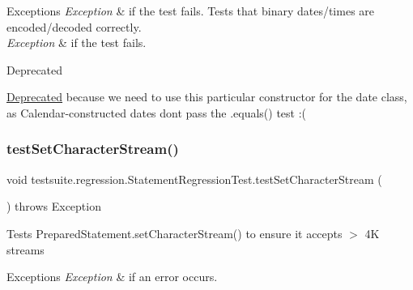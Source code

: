 \begin{DoxyExceptions}{Exceptions}
{\em Exception} & if the test fails. Tests that binary dates/times are encoded/decoded correctly.\\
\hline
{\em Exception} & if the test fails.\\
\hline
\end{DoxyExceptions}
\begin{DoxyRefDesc}{Deprecated}
\item[\mbox{\hyperlink{deprecated__deprecated000026}{Deprecated}}]because we need to use this particular constructor for the date class, as Calendar-\/constructed dates don\textquotesingle{}t pass the .equals() test \+:( \end{DoxyRefDesc}
\mbox{\label{classtestsuite_1_1regression_1_1_statement_regression_test_a8043401e658d50f132bd6407926ed1f6}} 
\subsubsection{\texorpdfstring{test\+Set\+Character\+Stream()}{testSetCharacterStream()}}
{\footnotesize\ttfamily void testsuite.\+regression.\+Statement\+Regression\+Test.\+test\+Set\+Character\+Stream (\begin{DoxyParamCaption}{ }\end{DoxyParamCaption}) throws Exception}

Tests Prepared\+Statement.\+set\+Character\+Stream() to ensure it accepts $>$ 4K streams


\begin{DoxyExceptions}{Exceptions}
{\em Exception} & if an error occurs. \\
\hline
\end{DoxyExceptions}
\mbox{\label{classtestsuite_1_1regression_1_1_statement_regression_test_a94ba62e42c45e2025b030f3a7f69ea17}} 

